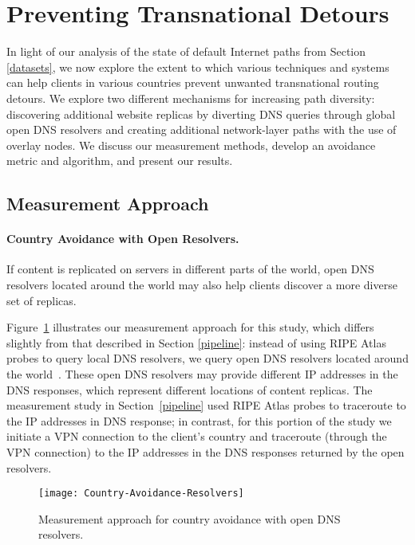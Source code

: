\section{Preventing Transnational Detours}
\label{avoid_results}

In light of our analysis of the state of default Internet paths from
Section \ref{datasets}, we now explore the extent to which various
techniques and systems can help clients in various countries prevent
unwanted transnational routing detours. We explore two different
mechanisms for increasing path diversity: discovering additional website
replicas by diverting DNS queries through global open DNS resolvers and
creating additional network-layer paths with the use of overlay nodes.
We discuss our measurement methods, develop an avoidance metric and
algorithm, and present our results.


\subsection{Measurement Approach}
\label{avoid_pipelines}

\paragraph{Country Avoidance with Open Resolvers.} If content is
replicated on servers in different parts of the world, open DNS
resolvers located 
around the world may also help clients discover a more diverse set of
replicas.  

Figure~\ref{fig:avoidance_resolvers} illustrates our measurement
approach for this study, which differs slightly from that described in
Section \ref{pipeline}: instead of using RIPE Atlas probes to query
local DNS resolvers, we query open DNS resolvers located around the
world~\cite{open_resolver_list}.  These open DNS resolvers may provide
different IP addresses in the DNS responses, which represent different
locations of content replicas. The measurement study in
Section~\ref{pipeline} used RIPE Atlas probes to traceroute to the IP
addresses in DNS response; in contrast, for this portion of the study we
initiate a VPN connection to the client's country and traceroute
(through the VPN connection) to the IP addresses in the DNS responses
returned by the open resolvers.

\begin{figure}[t]
\centering
\texttt{[image: Country-Avoidance-Resolvers]}
\caption{Measurement approach for country avoidance with open DNS resolvers.}
\label{fig:avoidance_resolvers}
\end{figure}

